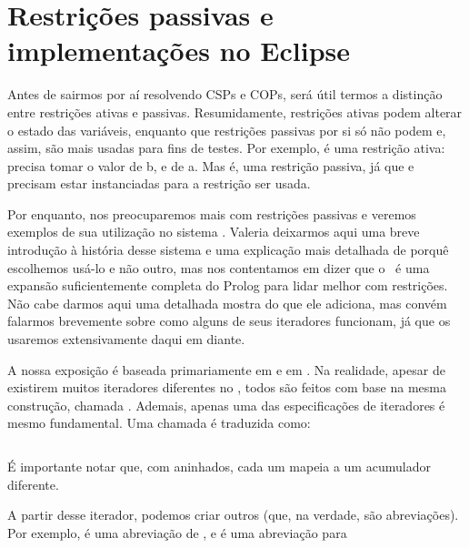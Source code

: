 
%

%
%

%

\section{Restrições passivas e implementações no Eclipse}

Antes de sairmos por aí resolvendo CSPs e COPs, será útil termos a distinção entre restrições ativas
e passivas. Resumidamente, restrições ativas podem alterar o estado das variáveis, enquanto que
restrições passivas por si só não podem e, assim, são mais usadas para fins de testes. Por exemplo,
 é uma restrição ativa:  precisa tomar o valor de b, e  de a. Mas
 é, uma restrição passiva, já que  e  precisam estar instanciadas
para a restrição ser usada.

Por enquanto, nos preocuparemos mais com restrições passivas e veremos exemplos de sua utilização no
sistema \eclipse. Valeria deixarmos aqui uma breve introdução à história desse sistema e uma
explicação mais detalhada de porquê escolhemos usá-lo e não outro, mas nos contentamos em dizer que
o \eclipse\ é uma expansão suficientemente completa do Prolog para lidar melhor com restrições. Não
cabe darmos aqui uma detalhada mostra do que ele adiciona, mas convém falarmos brevemente
sobre como alguns de seus iteradores funcionam, já que os usaremos extensivamente daqui em diante.

A nossa exposição é baseada primariamente em \cite{joachim} e em \cite{schimpf}. Na realidade,
apesar de existirem muitos iteradores diferentes no \eclipse, todos são feitos com base na mesma
construção, chamada . Ademais, apenas uma das especificações de iteradores é mesmo
fundamental. Uma chamada  é traduzida como:

    \begin{listing}
\inputminted{prolog}{../Exemplos/Cap8/prog8_fromto.pl}
    \end{listing}

\noindent É importante notar que, com  aninhados, cada um mapeia a um acumulador
diferente.

A partir desse iterador, podemos criar outros (que, na verdade, são abreviações). Por exemplo,
 é uma abreviação de , e  é uma abreviação para 


